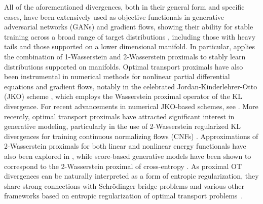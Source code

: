 \documentclass{amsart}
\newcommand{\MK}[1]{\textcolor{orange}{MK: #1}}
\theoremstyle{definition}
\theoremstyle{remark}
\numberwithin{equation}{section}
\begin{document}
All of the aforementioned divergences, both in their general form and specific cases, have been extensively used as objective functionals in generative adversarial networks (GANs) and gradient flows, showing their ability for stable training across a broad range of target distributions \cite{birrell2022structure, Gu_GPA,  birrell2023functionspace, glaser2021kale}, including those with heavy tails \cite{chen2024learning} and those supported on a lower dimensional manifold. In particular, \cite{gu2024combining} applies the combination of 1-Wasserstein and 2-Wasserstein proximals to stably learn distributions supported on manifolds. Optimal transport proximals have also been instrumental in numerical methods for nonlinear partial differential equations and gradient flows, notably in the celebrated Jordan-Kinderlehrer-Otto (JKO) scheme \cite{jordan1998variational}, which employs the Wasserstein proximal operator of the KL divergence. For recent advancements in numerical JKO-based schemes, see \cite{carrillo2022primal}. More recently, optimal transport proximals have attracted significant interest in generative modeling, particularly in the use of 2-Wasserstein regularized KL divergences for training continuous normalizing flows (CNFs) \cite{finlay2020train, onken2021ot}. Approximations of 2-Wasserstein proximals for both linear and nonlinear energy functionals have also been explored in \cite{li2023kernel}, while score-based generative models have been shown to correspond to the 2-Wasserstein proximal of cross-entropy \cite{zhang2024wasserstein, zhang2023mean}. 
As proximal OT divergences can be naturally interpreted as a form of entropic regularization, they share strong connections with Schr\"{o}dinger bridge problems \cite{nutz2024martingale} and various other frameworks based on entropic regularization of optimal transport problems~\cite{chen2016relation, peyre2019computational, chewi2025wasserstein}.
\end{document}
